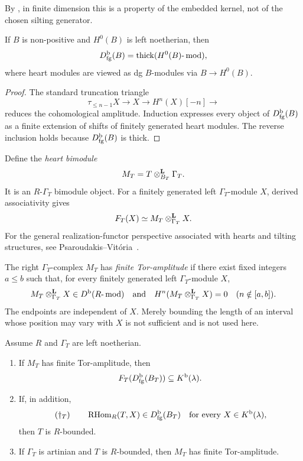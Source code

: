 By , in finite dimension this is a property of the embedded kernel, not of the chosen silting generator.

\begin{lemma}\label{lem:d-bfg-heart}
If \(B\) is non-positive and \(H^0(B)\) is left noetherian, then
\[
 D^{\mathrm b}_{\mathrm{fg}}(B)=\operatorname{thick}(H^0(B)\text{-}\operatorname{mod}),
\]
where heart modules are viewed as dg \(B\)-modules via
\(B\to H^0(B)\).
\end{lemma}

\begin{proof}
The standard truncation triangle
\[
 \tau_{\le n-1}X\longrightarrow X\longrightarrow H^n(X)[-n]\longrightarrow
\]
reduces the cohomological amplitude.  Induction expresses every object of
\(D^{\mathrm b}_{\mathrm{fg}}(B)\) as a finite extension of shifts of finitely generated heart modules.  The reverse inclusion holds because \(D^{\mathrm b}_{\mathrm{fg}}(B)\) is thick.
\end{proof}

Define the \emph{heart bimodule}
\[
 M_T=T\otimes^{\mathbf L}_{B_T}\Gamma_T.
\]
It is an \(R\)-\(\Gamma_T\) bimodule object.  For a finitely generated left \(\Gamma_T\)-module \(X\), derived associativity gives
\begin{equation}\label{eq:heart-realization}
 F_T(X)\simeq M_T\otimes^{\mathbf L}_{\Gamma_T}X.
\end{equation}
For the general realization-functor perspective associated with hearts and tilting structures, see Psaroudakis--Vit\'{o}ria~\cite{PsaroudakisVitoria18}.

\begin{definition}\label{def:fixed-tor-amplitude}
The right \(\Gamma_T\)-complex \(M_T\) has \emph{finite Tor-amplitude} if there exist fixed integers \(a\le b\) such that, for every finitely generated left \(\Gamma_T\)-module \(X\),
\[
 M_T\otimes^{\mathbf L}_{\Gamma_T}X\in D^{\mathrm b}(R\text{-}\operatorname{mod})
 \quad\text{and}\quad
 H^n(M_T\otimes^{\mathbf L}_{\Gamma_T}X)=0
 \quad(n\notin[a,b]).
\]
The endpoints are independent of \(X\).  Merely bounding the length of an interval whose position may vary with \(X\) is not sufficient and is not used here.
\end{definition}

\begin{proposition}\label{prop:noetherian-heart}
Assume \(R\) and \(\Gamma_T\) are left noetherian.
\begin{enumerate}[label=(\alph*)]
\item If \(M_T\) has finite Tor-amplitude, then
\[
 F_T(D^{\mathrm b}_{\mathrm{fg}}(B_T))\subseteq K^{\mathrm b}(\lambda).
\]
\item If, in addition,
\begin{equation}\label{eq:dagger}
 (\dagger_T)\qquad
 \operatorname{RHom}_R(T,X)\in D^{\mathrm b}_{\mathrm{fg}}(B_T)
 \quad\text{for every }X\in K^{\mathrm b}(\lambda),
\end{equation}
then \(T\) is \(R\)-bounded.
\item If \(\Gamma_T\) is artinian and \(T\) is \(R\)-bounded, then \(M_T\) has finite Tor-amplitude.
\end{enumerate}
\end{proposition}

